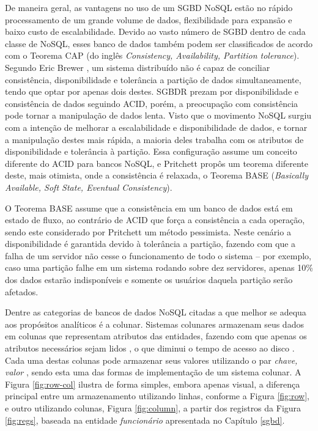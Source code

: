 De maneira geral, as vantagens no uso de um SGBD NoSQL estão no rápido processamento de um grande volume de dados, flexibilidade para expansão e baixo custo de escalabilidade. Devido ao vasto número de SGBD dentro de cada classe de NoSQL, esses banco de dados também podem ser classificados de acordo com o Teorema CAP (do inglês \textit{Consistency, Availability, Partition tolerance}). Segundo Eric Brewer \cite{brewer2000towards, gilbert2002brewer}, um sistema distribuído não é 
capaz de conciliar consistência, disponibilidade e tolerância a partição de dados simultaneamente, tendo que optar por apenas dois destes. 
SGBDR prezam por disponibilidade e consistência de dados seguindo ACID, porém, a preocupação com consistência 
pode tornar a manipulação de dados lenta. Visto que o movimento NoSQL surgiu com a intenção de 
melhorar a escalabilidade e disponibilidade de dados, e tornar a manipulação destes mais rápida, 
a maioria deles trabalha com os atributos de disponibilidade e tolerância à partição. 
Essa configuração assume um conceito diferente do ACID para bancos NoSQL, e Pritchett \cite{pritchett2008base} propôs um teorema diferente deste, mais otimista, onde a consistência é relaxada, o Teorema BASE (\textit{Basically Available, Soft State, Eventual Consistency}).

O Teorema BASE assume que a consistência em um banco 
de dados está em estado de fluxo, ao contrário de ACID que força a consistência a cada operação, 
sendo este considerado por Pritchett \cite{pritchett2008base} um método pessimista. 
Neste cenário a disponibilidade é garantida devido à tolerância a partição, fazendo 
com que a falha de um servidor não cesse o funcionamento de todo o sistema -- por exemplo, caso uma partição falhe em um sistema rodando sobre dez servidores, apenas 10\% dos dados estarão indisponíveis e somente os usuários daquela partição serão afetados.



Dentre as categorias de bancos de dados NoSQL citadas a que melhor se adequa aos 
propósitos analíticos é a colunar. Sistemas colunares armazenam seus dados 
em colunas que representam atributos das entidades, fazendo com que apenas os atributos necessários sejam 
lidos \cite{khoshafian1987query}, o que diminui o tempo de acesso 
ao disco \cite{matei2010column, abadi2008column}. Cada uma destas colunas pode armazenar seus valores utilizando o par 
\textit{chave, valor} \cite{abadi2013design, khoshafian1987query}, sendo esta uma das formas de implementação 
de um sistema colunar. 
A Figura \ref{fig:row-col} ilustra de forma simples, embora apenas visual, 
a diferença principal entre um armazenamento utilizando linhas, conforme a Figura \ref{fig:row}, e outro utilizando 
colunas, Figura \ref{fig:column}, a partir dos registros da Figura \ref{fig:regs}, baseada na entidade \textit{funcionário} apresentada no Capítulo \ref{sgbd}.

